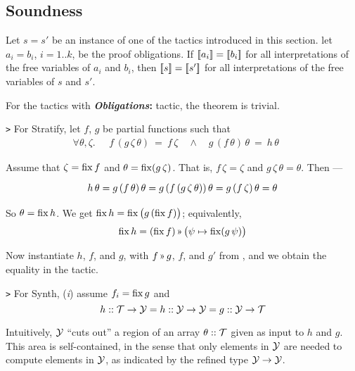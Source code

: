 \subsection{Soundness}
\label{tactics:soundness}

\renewenvironment{proof}{\noindent{\bf Proof.~}}{}

\begin{theorem}
Let $s=s'$ be an instance of one of the tactics introduced in this section.
let $a_i=b_i$, $i=1..k$, be the proof obligations. If $[\![{a_i}]\!]=[\![{b_i}]\!]$
for all interpretations of the free variables of $a_i$ and $b_i$, then
$[\![{s}]\!]=[\![{s'}]\!]$ for all interpretations of the free variables of $s$ and $s'$.
\end{theorem}

\begin{proof}
For the tactics with \textbf{\textit{Obligations}:} tactic, the theorem is trivial.

\medskip
\noindent
{\tt >} For {\sf Stratify}, let $f$, $g$ be partial functions such that
\vspace{-.5em}
\[\renewcommand\arraystretch{1.3}
  \forall \theta,\zeta.\quad \begin{array}{l}f\,(g\,\zeta\,\theta) ~=~ f\,\zeta \quad\land\quad
  g\,(f\,\theta)\,\theta ~=~ h\,\theta
  \end{array}\quad\]
  
Assume that $\zeta = \operatorname{fix} f$ and $\theta = \operatorname{fix} (g\,\zeta)$. 
That is, $f\,\zeta = \zeta$ and $g\,\zeta\,\theta = \theta$.
Then ---
\vspace{-.5em}
\[\renewcommand\arraystretch{1.3}
  \begin{array}{l@{}l}
   h\,\theta & {}= g\,(f\,\theta)\,\theta = g\,(f\,(g\,\zeta\,\theta))\,\theta =
              g\,(f\,\zeta)\,\theta = \theta
  \end{array}\]
  
\noindent
So $\theta = \operatorname{fix} h$. We get $\operatorname{fix} h = \operatorname{fix} \big(g \,(\operatorname{fix} f)\big)$; equivalently,
\[\fix h = (\fix f) \applt \big(\psi\mapsto\fix (g\,\psi)\big)\]

Now instantiate $h$, $f$, and $g$, with $f\applt g$, $f$, and $g'$ from ,
and we obtain the equality in the tactic.

\medskip
\noindent
{\tt >} For {\sf Synth}, ({\it i}) assume $f_i=\operatorname{fix} g$ and
\[h :: \mathcal{T}\to\mathcal{Y} = h :: \mathcal{Y}\to\mathcal{Y} = g :: \mathcal{Y}\to\mathcal{T}\]

Intuitively, $\mathcal{Y}$ ``cuts out'' a region of an array $\theta :: \mathcal{T}$ given
as input to $h$ and $g$. This area is self-contained, in the sense that
only elements in $\mathcal{Y}$ are needed to compute elements in $\mathcal{Y}$, as indicated
by the refined type $\mathcal{Y}\to\mathcal{Y}$.


\end{proof}
